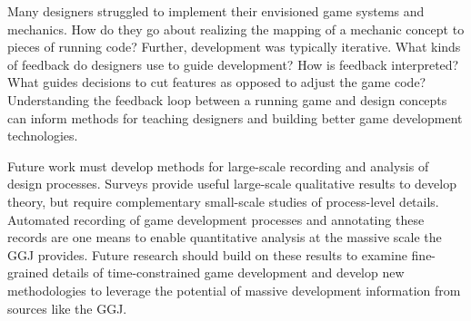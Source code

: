 \documentclass{sig-alternate}
\begin{document}
Many designers struggled to implement their envisioned game systems and mechanics. How do they go about realizing the mapping of a mechanic concept to pieces of running code? Further, development was typically iterative. What kinds of feedback do designers use to guide development? How is feedback interpreted? What guides decisions to cut features as opposed to adjust the game code? Understanding the feedback loop between a running game and design concepts can inform methods for teaching designers and building better game development technologies.

Future work must develop methods for large-scale recording and analysis of design processes. Surveys provide useful large-scale qualitative results to develop theory, but require complementary small-scale studies of process-level details. Automated recording of game development processes and annotating these records are one means to enable quantitative analysis at the massive scale the GGJ provides. 
Future research should build on these results to examine fine-grained details of time-constrained game development and develop new methodologies to leverage the potential of massive development information from sources like the GGJ.









\appendix
\end{document}
